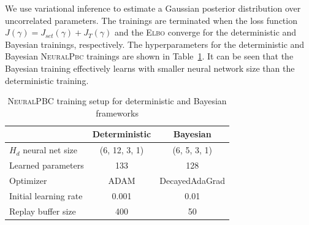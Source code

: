 We use variational inference to estimate a Gaussian posterior distribution
over uncorrelated parameters. The trainings are terminated when the loss
function $J(\gamma) = J_{set}(\gamma) + J_T(\gamma)$ and the \textsc{Elbo}
converge for the deterministic and Bayesian trainings, respectively.
%
The hyperparameters for the deterministic and Bayesian \textsc{NeuralPbc}
trainings are shown in Table~\ref{tab:training_setup_neuralpbc}.
%
It can be seen that the Bayesian training effectively learns with smaller
neural network size than the deterministic training.
\begin{table}[tb]
    \centering
    \caption{\textsc{NeuralPBC} training setup for deterministic and Bayesian frameworks}
    \begin{tabular}{lcc}
    \toprule
    & Deterministic & Bayesian \\
    \midrule
        $H_d$ neural net size & (6, 12, 3, 1) & (6, 5, 3, 1)\\
        Learned parameters & 133 & 128  \\
        Optimizer & \textsc{ADAM} & DecayedAdaGrad\\
        Initial learning rate & 0.001 & 0.01\\
        Replay buffer size & 400 & 50\\
    \bottomrule
    \end{tabular}
    \label{tab:training_setup_neuralpbc}
\end{table}

